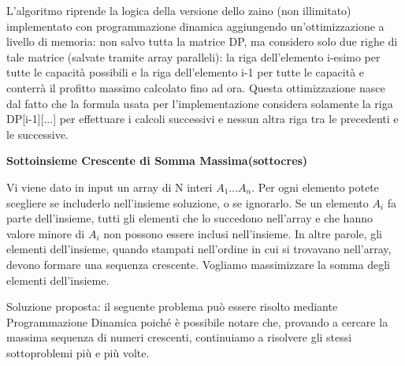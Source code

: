 \documentclass[../cheatSheetAlgoritmi.tex]{subfiles}
\begin{document}
L'algoritmo riprende la logica della versione dello zaino (non illimitato) implementato con programmazione dinamica aggiungendo un'ottimizzazione a livello di memoria: non salvo tutta la matrice DP, ma considero solo due righe di tale matrice (salvate tramite array paralleli): la riga dell'elemento i-esimo per tutte le capacità possibili e la riga dell'elemento i-1 per tutte le capacità e conterrà il profitto massimo calcolato fino ad ora. Questa ottimizzazione nasce dal fatto che la formula usata per l'implementazione considera solamente la riga DP[i-1][...] per effettuare i calcoli successivi e nessun altra riga tra le precedenti e le successive.

\bigskip

\textbf{Sottoinsieme Crescente di Somma Massima(sottocres)}

Vi viene dato in input un array di N interi $A_{1}...A_{n}$. Per ogni elemento potete scegliere se includerlo nell’insieme soluzione, o se ignorarlo. Se un elemento $A_{i}$ fa parte dell’insieme, tutti gli elementi che lo succedono nell’array e che hanno valore minore di $A_{i}$ non possono essere inclusi nell’insieme. In altre parole, gli elementi dell’insieme, quando stampati nell’ordine in cui si trovavano nell’array, devono formare una sequenza crescente.
Vogliamo massimizzare la somma degli elementi dell’insieme.

\bigskip

Soluzione proposta: il seguente problema può essere risolto mediante Programmazione Dinamica poiché è possibile notare che, provando a cercare la massima sequenza di numeri crescenti, continuiamo a risolvere gli stessi sottoproblemi più e più volte.
\end{document}
